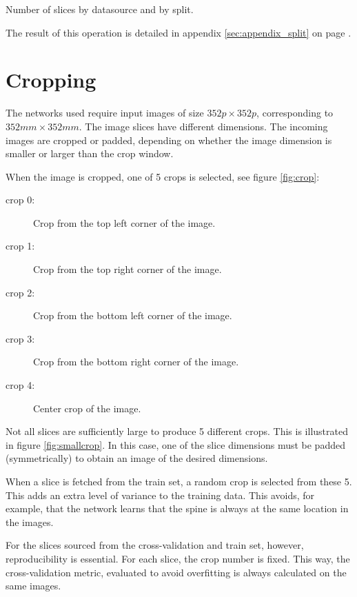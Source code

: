   \begin{table}
 
    
    \caption{Number of slices by datasource and by split.\label{tab:summary_split_slices}}
  
  \end{table}

The result of this operation is detailed in appendix \ref{sec:appendix_split} on page \pageref{sec:appendix_split}.

\section{Cropping\label{sec:cropping}}
The networks used require input images of size $352 p \times 352 p$, corresponding to $352 mm \times 352 mm$.
The image slices have different dimensions.
The incoming images are cropped or padded, depending on whether the image dimension is smaller or larger than the crop window.


When the image is cropped, one of 5 crops is selected, see figure \ref{fig:crop}:
\begin{description}
    \item[crop 0:] Crop from the top left corner of the image.
    \item[crop 1:] Crop from the top right corner of the image.
    \item[crop 2:] Crop from the bottom left corner of the image.
    \item[crop 3:] Crop from the bottom right corner of the image.
    \item[crop 4:] Center crop of the image.  
\end{description}

Not all slices are sufficiently large to produce 5 different crops. This is illustrated in figure \ref{fig:smallcrop}. In this case, one of the slice dimensions must be padded (symmetrically) to obtain an image of the desired dimensions.

When a slice is fetched from the train set, a random crop is selected from these 5.
This adds an extra level of variance to the training data. This avoids, for example, that the network learns that the spine is always at the same location in the images.

For the slices sourced from the cross-validation and train set, however, reproducibility is essential.
For each slice, the crop number is fixed.
This way, the cross-validation metric, evaluated to avoid overfitting is always calculated on the same images.

